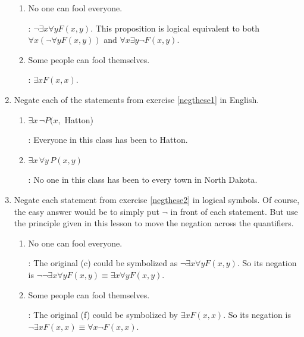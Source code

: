 \documentclass[11pt]{amsart}
\begin{document}
\begin{enumerate}
\begin{enumerate}

\item No one can fool everyone.

: $\neg\exists x \forall y F(x,y)$. 
This proposition is logical equivalent
to both $\forall x (\neg \forall y F(x,y))$ and $\forall x \exists y \neg F(x,y)$.

\item Some people can fool themselves.

: $\exists x F(x,x)$.

\end{enumerate}

\item Negate each of the statements from exercise \ref{negthese1} in English.

\begin{enumerate}

\item $\exists x\, \neg P(x,$ Hatton)

: Everyone in this class has been to Hatton.

\item $\exists x\, \forall y\, P(x,y)$

: No one in this class has been to every town in North Dakota.

\end{enumerate}

\item Negate each statement from exercise \ref{negthese2} in logical symbols.  Of course, the easy
answer would be to simply put $\neg$ in front of each statement. But use the principle
given in this lesson to move the negation across the quantifiers.
\begin{enumerate}

\item No one can fool everyone.

: The original (c) could be symbolized as $\neg\exists x \forall y F(x,y)$. 
\hfill\break
So its negation is $\neg\neg\exists x \forall y F(x,y)\equiv \exists x \forall y F(x,y)$.  

\item Some people can fool themselves.

: The original (f) could be symbolized by $\exists x F(x,x)$.\hfill\break 
So its
negation is $\neg\exists x F(x,x) \equiv \forall x \neg F(x,x)$.


\end{enumerate}
\end{enumerate}
\end{document}
